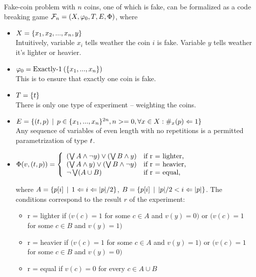\begin{example}
Fake-coin problem with $n$ coins, one of which is fake, can be formalized as
a code breaking game
$\mathcal{F}_n = (X, \varphi_0, T, E, \Phi)$, where

\begin{itemize}
\item
$X = \{x_1, x_2, ..., x_n, y\}$ \\
Intuitively, variable $x_i$ tells weather the coin $i$ is fake.
Variable $y$ tells weather it's lighter or heavier.

\item
$\varphi_0 = \textrm{Exactly-1}\:(\{x_1, ..., x_n\})$ \\
This is to ensure that exactly one coin is fake.

\item
$T = \{t\}$ \\
There is only one type of experiment -- weighting the coins.

\item
$E = \{ (t, p) \:\:|\:\:
  p \in \{x_1, ..., x_n\}^{2n},
  n >= 0,
  \forall x\in X: \#_x(p)<=1 \} $\\
Any sequence of variables of even length with no repetitions
  is a permitted parametrization of type $t$.

\item
$\Phi(v, (t, p)) = \left\{
\begin{array}{ll}
(\bigvee A \wedge \neg y) \vee (\bigvee B \wedge y) &
    \textrm{if r = lighter,} \\
(\bigvee A \wedge y) \vee (\bigvee B \wedge \neg y) &
    \textrm{if r = heavier,} \\
\neg \bigvee(A\cup B) &
    \textrm{if r = equal,}
\end{array} \right.$

where
$A = \{ p[i] \:\:|\:\: 1 <= i <= |p|/2 \}$,
$B = \{ p[i] \:\:|\:\: |p|/2 < i <= |p| \}$.
The conditions correspond to the result $r$ of the experiment:
\begin{itemize}
\item r = lighter if $(v(c) = 1$ for some $c\in A$ and $v(y) = 0)$
  or $(v(c) = 1$ for some $c \in B$ and $v(y) = 1)$
\item r = heavier if $(v(c) = 1$ for some $c\in A$ and $v(y) = 1)$
  or $(v(c) = 1$ for some $c \in B$ and $v(y) = 0)$
\item r = equal if $v(c) = 0$ for every $c\in A\cup B$
\end{itemize}
\end{itemize}
\end{example}

